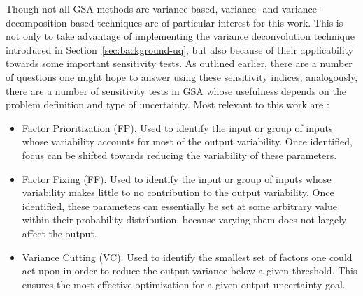 Though not all GSA methods are variance-based, variance- and variance-decomposition-based techniques are of particular interest for this work. This is not only to take advantage of implementing the variance deconvolution technique introduced in Section~\ref{sec:background-uq}, but also because of their applicability towards some important sensitivity tests. As outlined earlier, there are a number of questions one might hope to answer using these sensitivity indices; analogously, there are a number of sensitivity tests in GSA whose usefulness depends on the problem definition and type of uncertainty. Most relevant to this work are \cite{saltelliGSA}:
\begin{itemize}
    \item Factor Prioritization (FP). Used to identify the input or group of inputs whose variability accounts for most of the output variability. Once identified, focus can be shifted towards reducing the variability of these parameters.
    \item Factor Fixing (FF). Used to identify the input or group of inputs whose variability makes little to no contribution to the output variability. Once identified, these parameters can essentially be set at some arbitrary value within their probability distribution, because varying them does not largely affect the output.
    \item Variance Cutting (VC). Used to identify the smallest set of factors one could act upon in order to reduce the output variance below a given threshold. This ensures the most effective optimization for a given output uncertainty goal.
\end{itemize}

